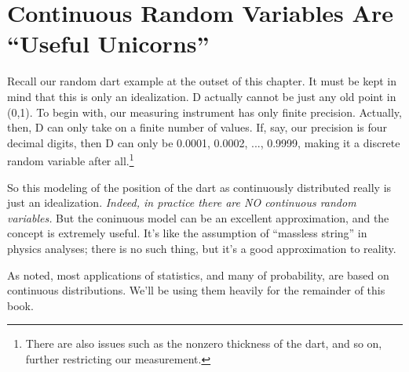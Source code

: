 \section{Continuous Random Variables Are ``Useful Unicorns''}
\label{unicorns}

Recall our random dart example at the outset of this chapter.  It must
be kept in mind that this is only an idealization.  D actually cannot be
just any old point in (0,1).  To begin with, our measuring instrument
has only finite precision.  Actually, then, D can only take on a finite
number of values.  If, say, our precision is four decimal digits, then D
can only be 0.0001, 0.0002, ...,  0.9999, making it a discrete random
variable after all.\footnote{There are also issues such as the nonzero
thickness of the dart, and so on, further restricting our measurement.}

So this modeling of the position of the dart as continuously distributed
really is just an idealization.  {\it Indeed, in practice there are NO
continuous random variables.}  But the coninuous model can be an
excellent approximation, and the concept is extremely useful.  It's like
the assumption of ``massless string'' in physics analyses; there is no
such thing, but it's a good approximation to reality.

As noted, most applications of statistics, and many of probability, are
based on continuous distributions.  We'll be using them heavily for the
remainder of this book.

